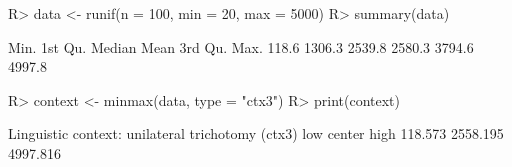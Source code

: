 \begin{Schunk}
% --begin: "minmax"
\begin{Sinput}
R> data <- runif(n = 100, min = 20, max = 5000)
R> summary(data)
\end{Sinput}
\begin{Soutput}
   Min. 1st Qu.  Median    Mean 3rd Qu.    Max. 
  118.6  1306.3  2539.8  2580.3  3794.6  4997.8 
\end{Soutput}
\begin{Sinput}
R> context <- minmax(data, type = "ctx3")
R> print(context)
\end{Sinput}
\begin{Soutput}
Linguistic context: unilateral trichotomy (ctx3)
     low   center     high 
 118.573 2558.195 4997.816 
\end{Soutput}
% --end: "minmax"
\end{Schunk}
